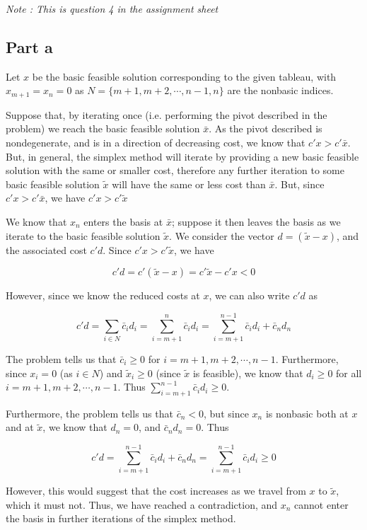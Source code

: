 \textit{Note : This is question 4 in the assignment sheet}

\subsection{Part a}

Let $x$ be the basic feasible solution corresponding to the given tableau, with $x_{m+1}=x_n=0$ as $N=\{m+1, m+2, \cdots , n-1, n\}$ are the nonbasic indices. 

Suppose that, by iterating once (i.e. performing the pivot described in the problem) we reach the basic feasible solution $\bar{x}$. As the pivot described is nondegenerate, and is in a direction of decreasing cost, we know that $c'x>c'\bar{x}$. But, in general, the simplex method will iterate by providing a new basic feasible solution with the same or smaller cost, therefore any further iteration to some basic feasible solution $\tilde{x}$ will have the same or less cost than $\bar{x}$. But, since $c'x>c'\bar{x}$, we have $c'x>c'\tilde{x}$

We know that $x_n$ enters the basis at $\bar{x}$; suppose it then leaves the basis as we iterate to the basic feasible solution $\tilde{x}$. We consider the vector $d=(\tilde{x}-x)$, and the associated cost $c'd$. Since $c'x>c'\tilde{x}$, we have

$$
c'd=c'(\tilde{x}-x)=c'\tilde{x}-c'x<0
$$

However, since we know the reduced costs at $x$, we can also write $c'd$ as

$$
c'd=\sum_{i\in N}\bar{c}_id_i=\sum_{i=m+1}^n\bar{c}_id_i=\sum_{i=m+1}^{n-1}\bar{c}_id_i+\bar{c}_nd_n
$$

The problem tells us that $\bar{c}_i\geq 0$ for $i=m+1, m+2, \cdots, n-1$. Furthermore, since $x_i=0$ (as $i\in N$) and $\tilde{x}_i\geq 0$ (since $\tilde{x}$ is feasible), we know that $d_i\geq 0$ for all $i=m+1, m+2, \cdots, n-1$. Thus $\sum_{i=m+1}^{n-1}\bar{c}_id_i\geq 0$.

Furthermore, the problem tells us that $\bar{c}_n<0$, but since $x_n$ is nonbasic both at $x$ and at $\tilde{x}$, we know that $d_n=0$, and $\bar{c}_nd_n=0$. Thus

$$
c'd=\sum_{i=m+1}^{n-1}\bar{c}_id_i+\bar{c}_nd_n=\sum_{i=m+1}^{n-1}\bar{c}_id_i \geq 0
$$

However, this would suggest that the cost increases as we travel from $x$ to $\tilde{x}$, which it must not. Thus, we have reached a contradiction, and $x_n$ cannot enter the basis in further iterations of the simplex method.

